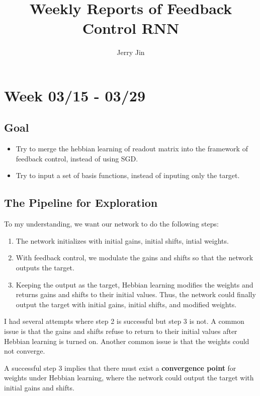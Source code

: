 \documentclass[12pt, a4paper]{article}
\title{Weekly Reports of Feedback Control RNN}
\author{Jerry Jin}
\begin{document}
\maketitle

\section*{Week 03/15 - 03/29}

\subsection*{Goal}

\noindent
\begin{itemize}
    \item Try to merge the hebbian learning of readout matrix into the framework of feedback control, instead of using SGD.
    \item Try to input a set of basis functions, instead of inputing only the target.

\end{itemize}

\newpage

\subsection*{The Pipeline for Exploration}

To my understanding, we want our network to do the following steps:

\begin{enumerate}
    \item The network initializes with initial gains, initial shifts, intial weights.
    \item With feedback control, we modulate the gains and shifts so that the network outputs the target.
    \item Keeping the output as the target, Hebbian learning modifies the weights and returns gains and shifts to their initial values. Thus, the network could finally output the target with initial gains, initial shifts, and modified weights. 
\end{enumerate}

I had several attempts where step 2 is successful but step 3 is not. A common issue is that the gains and shifts refuse to return to their initial values after Hebbian learning is turned on. Another common issue is that the weights could not converge.

A successful step 3 implies that there must exist a \textbf{convergence point} for weights under Hebbian learning, where the network could output the target with initial gains and shifts.
\end{document}
